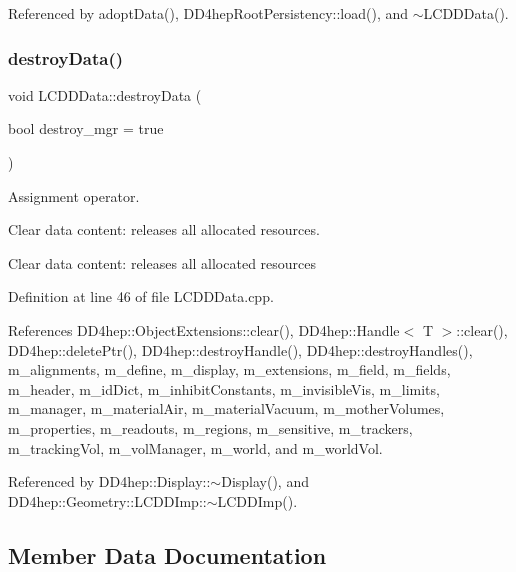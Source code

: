 Referenced by adopt\+Data(), D\+D4hep\+Root\+Persistency\+::load(), and $\sim$\+L\+C\+D\+D\+Data().

\hypertarget{class_d_d4hep_1_1_geometry_1_1_l_c_d_d_data_a8c54de26155fec96a884f912f9c7a0ee}{}\label{class_d_d4hep_1_1_geometry_1_1_l_c_d_d_data_a8c54de26155fec96a884f912f9c7a0ee} 
\subsubsection{\texorpdfstring{destroy\+Data()}{destroyData()}}
{\footnotesize\ttfamily void L\+C\+D\+D\+Data\+::destroy\+Data (\begin{DoxyParamCaption}\item[{bool}]{destroy\+\_\+mgr = {\ttfamily true} }\end{DoxyParamCaption})}



Assignment operator. 

Clear data content\+: releases all allocated resources.

Clear data content\+: releases all allocated resources 

Definition at line 46 of file L\+C\+D\+D\+Data.\+cpp.



References D\+D4hep\+::\+Object\+Extensions\+::clear(), D\+D4hep\+::\+Handle$<$ T $>$\+::clear(), D\+D4hep\+::delete\+Ptr(), D\+D4hep\+::destroy\+Handle(), D\+D4hep\+::destroy\+Handles(), m\+\_\+alignments, m\+\_\+define, m\+\_\+display, m\+\_\+extensions, m\+\_\+field, m\+\_\+fields, m\+\_\+header, m\+\_\+id\+Dict, m\+\_\+inhibit\+Constants, m\+\_\+invisible\+Vis, m\+\_\+limits, m\+\_\+manager, m\+\_\+material\+Air, m\+\_\+material\+Vacuum, m\+\_\+mother\+Volumes, m\+\_\+properties, m\+\_\+readouts, m\+\_\+regions, m\+\_\+sensitive, m\+\_\+trackers, m\+\_\+tracking\+Vol, m\+\_\+vol\+Manager, m\+\_\+world, and m\+\_\+world\+Vol.



Referenced by D\+D4hep\+::\+Display\+::$\sim$\+Display(), and D\+D4hep\+::\+Geometry\+::\+L\+C\+D\+D\+Imp\+::$\sim$\+L\+C\+D\+D\+Imp().



\subsection{Member Data Documentation}
\hypertarget{class_d_d4hep_1_1_geometry_1_1_l_c_d_d_data_ad01e1162ee7ded020b446e0c0c5b64f2}{}\label{class_d_d4hep_1_1_geometry_1_1_l_c_d_d_data_ad01e1162ee7ded020b446e0c0c5b64f2} 

